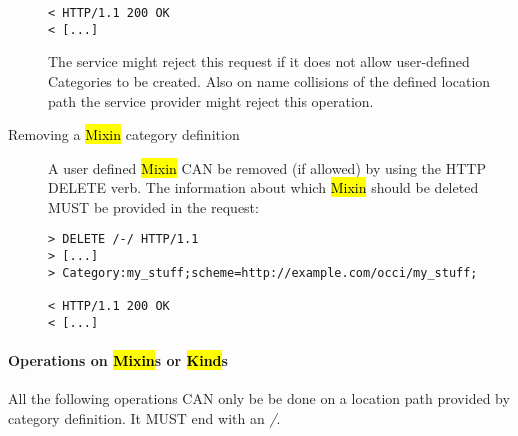 \documentclass[10pt,a4paper]{article}
\begin{document}
\begin{description}
\begin{verbatim}
< HTTP/1.1 200 OK
< [...]
\end{verbatim}
The service might reject this request if it does not allow
user-defined Categories to be created. Also on name collisions of the
defined location path the service provider might reject this
operation.

\item[Removing a \hl{Mixin} category definition] A user defined
  \hl{Mixin} CAN be removed (if allowed) by using the HTTP DELETE
  verb. The information about which \hl{Mixin} should be deleted MUST
  be provided in the request:
\begin{verbatim}
> DELETE /-/ HTTP/1.1
> [...]
> Category:my_stuff;scheme=http://example.com/occi/my_stuff;

< HTTP/1.1 200 OK
< [...]
\end{verbatim}
\end{description}

\paragraph{Operations on \hl{Mixin}s or \hl{Kind}s}
All the following operations CAN only be be done on a location path
provided by category definition. It MUST end with an \emph{/}.
\end{document}
